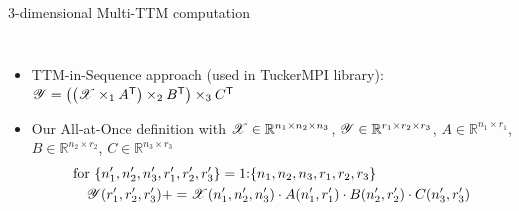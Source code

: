 \documentclass[aspectratio=169]{beamer}
\newcommand{\X}{\T{X}}
\newcommand{\Y}{\T{Y}}
\begin{document}
\begin{frame}{3-dimensional Multi-TTM computation}
\begin{columns}
\begin{column}{0.56\linewidth}
\begin{itemize}
{					%
			}\end{itemize}
		\end{column}
	\end{columns}
	\vfill
	\begin{itemize}
		\item TTM-in-Sequence approach (used in TuckerMPI library):
		$\Y = \left(\left(\X \times_1 A^\Tra \right)\times_2 B^\Tra \right)\times_3 C^\Tra$
		\vfill
		\item Our All-at-Once definition with {\small$\X \in \mathbb{R}^{n_1\times n_2\times n_3}$, $\Y\in \mathbb{R}^{r_1 \times r_2 \times r_3}$, $A\in \mathbb{R}^{n_1\times r_1}$, $B\in \mathbb{R}^{n_2\times r_2}$, $C\in \mathbb{R}^{n_3\times r_3}$
			\begin{align*}
			&\text{for \{$n_1^\prime, n_2^\prime, n_3^\prime, r_1^\prime, r_2^\prime, r_3^\prime$\}} = 1{:}\text{\{$n_1,n_2,n_3,r_1,r_2,r_3$\}}\\
			&\quad  \Y(r_1^\prime,r_2^\prime,r_3^\prime) += \X(n_1^\prime,n_2^\prime,n_3^\prime) \cdot  A(n_{1}^\prime,r_1^\prime) \cdot B(n_2^\prime,r_2^\prime) \cdot C(n_3^\prime,r_3^\prime)
			\end{align*}\vspace*{-0.5cm}
		}
	\end{itemize}
\end{frame}
\end{document}
